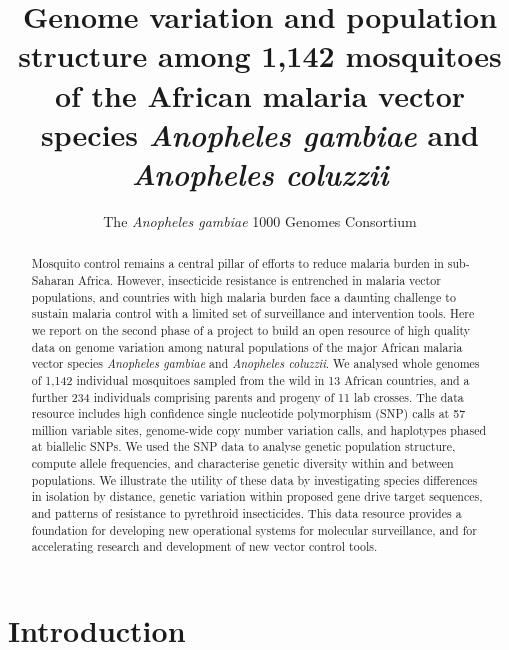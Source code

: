 \documentclass[a4paper,11pt,abstracton,hidelinks]{scrartcl}
\title{
Genome variation and population structure among 1,142 mosquitoes of the African malaria vector species \emph{Anopheles gambiae} and \emph{Anopheles coluzzii}
}
\author[1]{\small The \emph{Anopheles gambiae} 1000 Genomes Consortium}
\affil[1]{\footnotesize A list of consortium members appears at the end of the paper}
\begin{document}
\maketitle


\begin{abstract}


Mosquito control remains a central pillar of efforts to reduce malaria burden in sub-Saharan Africa.
%
However, insecticide resistance is entrenched in malaria vector populations, and countries with high malaria burden face a daunting challenge to sustain malaria control with a limited set of surveillance and intervention tools. 
%
Here we report on the second phase of a project to build an open resource of high quality data on genome variation among natural populations of the major African malaria vector species \textit{Anopheles gambiae} and \textit{Anopheles coluzzii}. 
%
We analysed whole genomes of 1,142 individual mosquitoes sampled from the wild in 13 African countries, and a further 234 individuals comprising parents and progeny of 11 lab crosses. 
%
The data resource includes high confidence single nucleotide polymorphism (SNP) calls at 57 million variable sites, genome-wide copy number variation calls, and haplotypes phased at biallelic SNPs.
%
We used the SNP data to analyse genetic population structure, compute allele frequencies, and characterise genetic diversity within and between populations.
%
We illustrate the utility of these data by investigating species differences in isolation by distance, genetic variation within proposed gene drive target sequences, and patterns of resistance to pyrethroid insecticides.
%
This data resource provides a foundation for developing new operational systems for molecular surveillance, and for accelerating research and development of new vector control tools.

\end{abstract}


\section*{Introduction}
\end{document}
